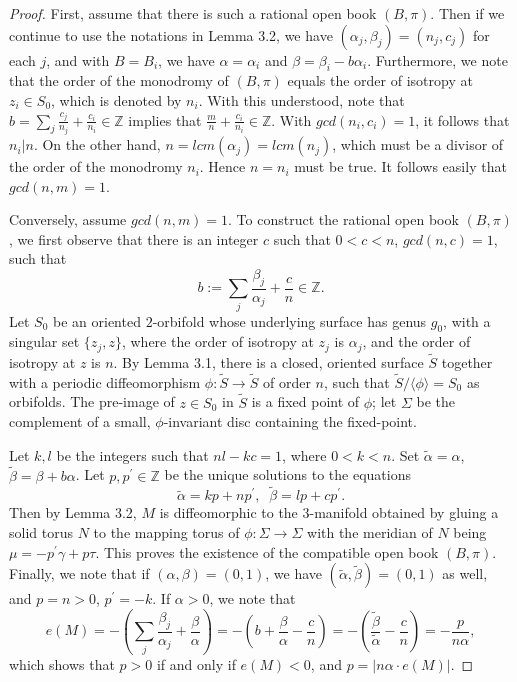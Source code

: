 \documentclass[11pt]{amsart}
\theoremstyle{plain}
\numberwithin{theorem}{section}
\theoremstyle{definition}
\newcommand{\Z}{{\mathbb Z}}
\begin{document}
\begin{proof}
First, assume that there is such a rational open book $(B,\pi)$. Then if we continue to use the notations in Lemma 3.2, we have $(\alpha_j,\beta_j)=(n_j,c_j)$ for each $j$, and with $B=B_i$, we have $\alpha=\alpha_i$ and $\beta=\beta_i-b\alpha_i$. Furthermore, we note that the order of the monodromy of $(B,\pi)$ equals the order of isotropy at $z_i\in S_0$, which is denoted by $n_i$. 
With this understood, note that $b=\sum_j \frac{c_j}{n_j}+\frac{c_i}{n_i}\in \Z$ implies that 
$\frac{m}{n}+\frac{c_i}{n_i}\in\Z$. With $gcd(n_i,c_i)=1$, it follows that $n_i|n$. On the other hand, $n=lcm(\alpha_j)=lcm(n_j)$, which must be a divisor of the order of the monodromy $n_i$. Hence $n=n_i$ must be true. It follows easily that $gcd(n,m)=1$. 

Conversely, assume $gcd(n,m)=1$. To construct the rational open book $(B,\pi)$, we first observe that there is an integer $c$ such that $0<c<n$, $gcd(n,c)=1$, such that 
$$
b:=\sum_j \frac{\beta_j}{\alpha_j}+\frac{c}{n}\in\Z.
$$
Let $S_0$ be an oriented $2$-orbifold whose underlying surface has genus $g_0$, with a singular set
$\{z_j,z\}$, where the order of isotropy at $z_j$ is $\alpha_j$, and the order of isotropy at $z$ is $n$.
By Lemma 3.1, there is a closed, oriented surface $\tilde{S}$ together with a periodic diffeomorphism 
$\phi: \tilde{S}\rightarrow \tilde{S}$ of order $n$, such that $\tilde{S}/\langle\phi\rangle=S_0$ as orbifolds. The pre-image of $z\in S_0$ in $\tilde{S}$ is a fixed point of $\phi$; let $\Sigma$ be the complement of a small, $\phi$-invariant disc containing the fixed-point. 

Let $k,l$ be the integers such that $nl-kc=1$, where $0<k<n$. Set $\tilde{\alpha}=\alpha$, 
$\tilde{\beta}=\beta+b\alpha$. Let $p,p^\prime\in\Z$ be the unique solutions to the equations
$$
\tilde{\alpha}=kp+np^\prime,\;\; \tilde{\beta}=lp+cp^\prime.
$$
Then by Lemma 3.2, $M$ is diffeomorphic to the $3$-manifold obtained by gluing a solid torus $N$ to
the mapping torus of $\phi: \Sigma\rightarrow \Sigma$ with the meridian of $N$ being 
$\mu=-p^\prime\gamma+p\tau$. This proves the existence of the compatible open book $(B,\pi)$.
Finally, we note that if $(\alpha,\beta)=(0,1)$, we have $(\tilde{\alpha},\tilde{\beta})=(0,1)$ as well,
and $p=n>0$, $p^\prime=-k$. If $\alpha>0$, we note that
$$
e(M)=-(\sum_j\frac{\beta_j}{\alpha_j}+\frac{\beta}{\alpha})=-(b+\frac{\beta}{\alpha}-\frac{c}{n})=
-(\frac{\tilde{\beta}}{\tilde{\alpha}}-\frac{c}{n})=-\frac{p}{n\alpha},
$$
which shows that $p>0$ if and only if $e(M)<0$, and $p=|n\alpha \cdot e(M)|$.


\end{proof}
\end{document}
